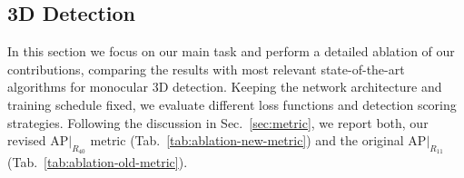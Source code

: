 \documentclass[10pt,twocolumn,letterpaper]{article}
\begin{document}
\subsection{3D Detection}

In this section we focus on our main task and perform a detailed ablation of our contributions, comparing the results with most relevant state-of-the-art algorithms for monocular 3D detection.
Keeping the network architecture and training schedule fixed, we evaluate different loss functions and detection scoring strategies.
Following the discussion in Sec.~\ref{sec:metric}, we report both, our revised $\text{AP}|_{R_{40}}$ metric (Tab.~\ref{tab:ablation-new-metric}) and the original $\text{AP}|_{R_{11}}$ (Tab.~\ref{tab:ablation-old-metric}).
\end{document}
